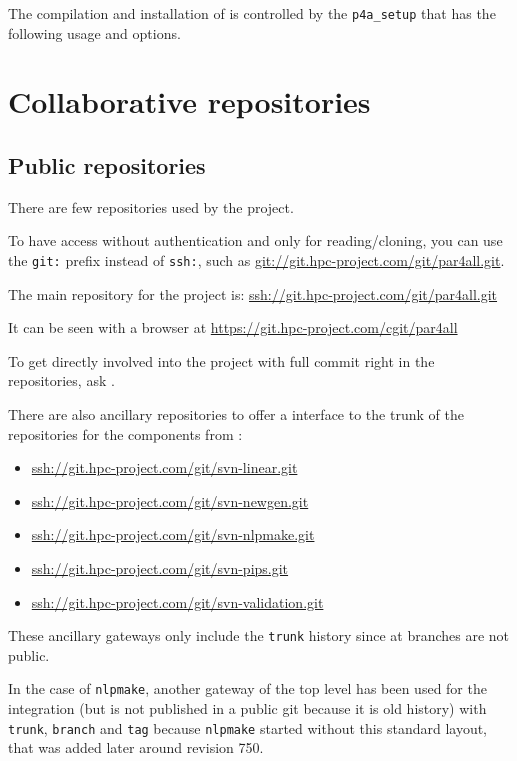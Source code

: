 \documentclass[a4paper]{article}
\begin{document}
The compilation and installation of \Apfa is controlled by the
\verb|p4a_setup| that has the following usage and options.




\section{Collaborative repositories}
\label{sec:coll-repos}


\subsection{Public repositories}
\label{sec:public-repositories}

There are few \Agit repositories used by the project.

To have access without authentication and only for reading/cloning, you
can use the \texttt{git:} prefix instead of \texttt{ssh:}, such as
\url{git://git.hpc-project.com/git/par4all.git}.

The main repository for the project is:
\url{ssh://git.hpc-project.com/git/par4all.git}

It can be seen with a \Awww browser at
\url{https://git.hpc-project.com/cgit/par4all}

To get directly involved into the project with full commit right in the
repositories, ask \Ahpcp.

There are also ancillary \Agit repositories to offer a \Agit interface to
the trunk of the \Asvn repositories for the \Apips components from
\Acri:
\begin{itemize}
\item \url{ssh://git.hpc-project.com/git/svn-linear.git}
\item \url{ssh://git.hpc-project.com/git/svn-newgen.git}
\item \url{ssh://git.hpc-project.com/git/svn-nlpmake.git}
\item \url{ssh://git.hpc-project.com/git/svn-pips.git}
\item \url{ssh://git.hpc-project.com/git/svn-validation.git}
\end{itemize}
These ancillary gateways only include the \texttt{trunk} history since at
\Acri branches are not public.

In the case of \texttt{nlpmake}, another \Agit{} \Asvn gateway of the top
level has been used for the integration (but is not published in a public
git because it is old history) with \texttt{trunk}, \texttt{branch} and
\texttt{tag} because \texttt{nlpmake} started without this standard
layout, that was added later around revision 750.
\end{document}
